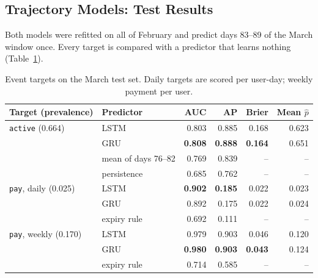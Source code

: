 
\subsection{Trajectory Models: Test Results}

Both models were refitted on all of February and predict days 83--89 of the March window once.
Every target is compared with a predictor that learns nothing (Table~\ref{tab:traj-events}).

\begin{table}[htbp]
\centering
\caption{Event targets on the March test set. Daily targets are scored per user-day; weekly payment per user.}
\label{tab:traj-events}
\begin{tabular}{llrrrr}
\toprule
Target (prevalence) & Predictor & AUC & AP & Brier & Mean $\hat p$ \\
\midrule
\texttt{active} (0.664)      & LSTM            & 0.803 & 0.885 & 0.168 & 0.623 \\
                             & GRU             & \textbf{0.808} & \textbf{0.888} & \textbf{0.164} & 0.651 \\
                             & mean of days 76--82 & 0.769 & 0.839 & -- & -- \\
                             & persistence     & 0.685 & 0.762 & -- & -- \\
\midrule
\texttt{pay}, daily (0.025)  & LSTM            & \textbf{0.902} & \textbf{0.185} & 0.022 & 0.023 \\
                             & GRU             & 0.892 & 0.175 & 0.022 & 0.024 \\
                             & expiry rule     & 0.692 & 0.111 & -- & -- \\
\midrule
\texttt{pay}, weekly (0.170) & LSTM            & 0.979 & 0.903 & 0.046 & 0.120 \\
                             & GRU             & \textbf{0.980} & \textbf{0.903} & \textbf{0.043} & 0.124 \\
                             & expiry rule     & 0.714 & 0.585 & -- & -- \\
\bottomrule
\end{tabular}
\end{table}

